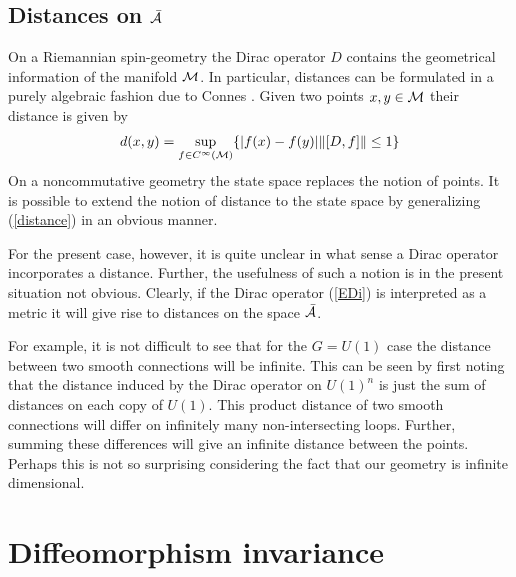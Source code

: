 \documentclass[12pt]{article}
\newcommand{\ba}{\begin{eqnarray}}
\newcommand{\ea}{\end{eqnarray}}
\def\ca{{\cal A}}
\def\cm{{\cal M}}
\begin{document}
\subsection{Distances on $\bar{\ca}$}

On a Riemannian spin-geometry the Dirac operator $D$ contains the geometrical
information of the manifold $\cm$. In particular, distances can be formulated in a
purely algebraic fashion due to Connes \cite{ConnesBook}. Given two points $x,y\in\cm$ their
distance is given by
\ba
d(x,y)=\sup_{f\in C^\infty(\cm)}\{ |f(x)-f(y)| \| [D,f]\|\leq 1    \}
\label{distance}
\ea
On a noncommutative geometry the state space replaces the notion of points. It
is possible to extend the notion of distance to the state space by
generalizing (\ref{distance}) in an obvious manner. 

For the present case, however, it is quite unclear in what sense a Dirac
operator incorporates a distance. Further, the usefulness of such a notion is
in the present situation
not obvious. Clearly, if the Dirac operator (\ref{EDi}) is interpreted as a
metric it will give rise to distances on the space $\bar{\ca}$. 

For example, it is not difficult to see that for the $G =U(1)$ case the
distance between two smooth connections will be infinite. This can be seen by first
noting that the distance induced by the Dirac operator on $U(1)^n$ is just the
sum of distances on each copy of $U(1)$. This product distance of two smooth connections will differ on infinitely many
non-intersecting loops. Further, summing these differences will give an
infinite distance between the points. Perhaps this is not
so surprising considering the fact that our geometry is infinite dimensional.

 



\section{Diffeomorphism invariance}
\label{section-diffeomorphism}
\end{document}
